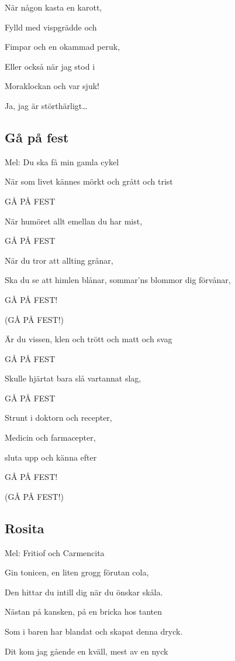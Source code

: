 När någon kasta en karott,

Fylld med vispgrädde och

Fimpar och en okammad peruk,

Eller också när jag stod i

Moraklockan och var sjuk!

Ja, jag är störthärligt… \bigskip

\subsection{\textbf{Gå på fest}}

Mel: Du ska få min gamla cykel\bigskip


När som livet kännes mörkt och grått och trist

GÅ PÅ FEST

När humöret allt emellan du har mist,

GÅ PÅ FEST

När du tror att allting grånar,

Ska du se att himlen blånar, sommar'ns blommor dig 
förvånar,

GÅ PÅ FEST!

(GÅ PÅ FEST!)\bigskip

Är du vissen, klen och trött och matt och svag

GÅ PÅ FEST

Skulle hjärtat bara slå vartannat slag,

GÅ PÅ FEST

Strunt i doktorn och recepter,

Medicin och farmacepter,

sluta upp och känna efter

GÅ PÅ FEST!

(GÅ PÅ FEST!)\bigskip

\subsection{\textbf{Rosita}}

Mel: Fritiof och Carmencita\bigskip

Gin tonicen, en liten grogg förutan cola,

Den hittar du intill dig när du önskar skåla.

Nästan på kansken, på en bricka hos tanten

Som i baren har blandat och skapat denna dryck.

Dit kom jag gående en kväll, mest av en nyck

